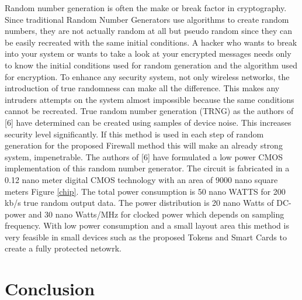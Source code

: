 \documentclass[11pt,onecolumn,cspaper,compsoc]{IEEEtran}
\begin{document}
Random number generation is often the make or break factor in cryptography. Since traditional Random Number Generators use algorithms to create random numbers, they are not actually random at 
all but pseudo random since they can be easily recreated with the same initial conditions. A hacker who wants to break into your system or wants to take a look at your encrypted messages needs 
only to know the initial conditions used for random generation and the algorithm used for encryption. To enhance any security system, not only wireless networks, the introduction of true 
randomness can make all the difference. This makes any intruders attempts on the system almost impossible because the same conditions cannot be recreated. True random number generation (TRNG) 
as the authors of [6] have determined can be created using samples of device noise. This increases security level significantly. If this method is used in each step of random generation 
for the proposed Firewall method this will make an already strong system, impenetrable. The authors of [6] have formulated a low power CMOS implementation of this random number generator. The 
circuit is fabricated in a 0.12 nano meter digital CMOS technology with an area of 9000 nano square meters Figure \ref{chip}. The total power consumption is 50 nano WATTS for 200 kb/s true 
random output data. The power distribution is 20 nano Watts of DC-power and 30 nano Watts/MHz for clocked power which depends on sampling frequency. With low power consumption and a small layout 
area this method is very feasible in small devices such as the proposed Tokens and Smart Cards to create a fully protected netowrk.

\section{Conclusion}
\end{document}

